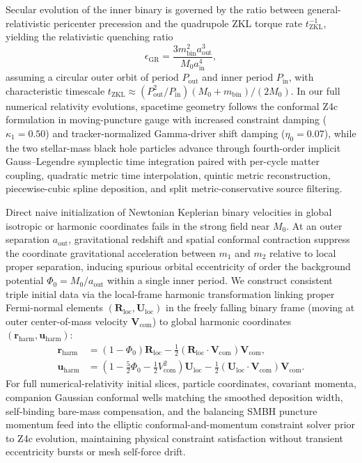 \documentclass[aps,prl,twocolumn,10pt,superscriptaddress,nofootinbib,longbibliography,floatfix]{revtex4-2}
\newcommand{\Mzero}{M_0}
\newcommand{\mbin}{m_{\mathrm{bin}}}
\newcommand{\ain}{a_{\mathrm{in}}}
\newcommand{\aout}{a_{\mathrm{out}}}
\newcommand{\epsGR}{\epsilon_{\mathrm{GR}}}
\newcommand{\tZKL}{t_{\mathrm{ZKL}}}
\begin{document}
Secular evolution of the inner binary is governed by the ratio between general-relativistic pericenter precession and the quadrupole ZKL torque rate $\tZKL^{-1}$, yielding the relativistic quenching ratio \cite{Blaes:2002,Liu:2015}
\begin{equation}
  \epsGR = \frac{3 \mbin^2 \aout^3}{\Mzero \ain^4},
\end{equation}
assuming a circular outer orbit of period $P_{\mathrm{out}}$ and inner period $P_{\mathrm{in}}$, with characteristic timescale $\tZKL \approx (P_{\mathrm{out}}^2 / P_{\mathrm{in}})(\Mzero + \mbin)/(2\Mzero)$. In our full numerical relativity evolutions, spacetime geometry follows the conformal Z4c formulation \cite{Hilditch:2012fp,Zhu:2024utz} in moving-puncture gauge with increased constraint damping ($\kappa_1 = 0.50$) and tracker-normalized Gamma-driver shift damping ($\eta_0 = 0.07$), while the two stellar-mass black hole particles advance through fourth-order implicit Gauss--Legendre symplectic time integration \cite{SanzSerna:1988,Wu:2026nrpic} paired with per-cycle matter coupling, quadratic metric time interpolation, quintic metric reconstruction, piecewise-cubic spline deposition, and split metric-conservative source filtering.

Direct naive initialization of Newtonian Keplerian binary velocities in global isotropic or harmonic coordinates fails in the strong field near $\Mzero$. At an outer separation $\aout$, gravitational redshift and spatial conformal contraction suppress the coordinate gravitational acceleration between $m_1$ and $m_2$ relative to local proper separation, inducing spurious orbital eccentricity of order the background potential $\Phi_0 = \Mzero/\aout$ within a single inner period. We construct consistent triple initial data via the local-frame harmonic transformation linking proper Fermi-normal elements $(\bm{R}_{\mathrm{loc}}, \bm{U}_{\mathrm{loc}})$ in the freely falling binary frame (moving at outer center-of-mass velocity $\bm{V}_{\mathrm{com}}$) to global harmonic coordinates $(\bm{r}_{\mathrm{harm}}, \bm{u}_{\mathrm{harm}})$:
\begin{align}
  \bm{r}_{\mathrm{harm}} &= (1 - \Phi_0)\bm{R}_{\mathrm{loc}} - \tfrac{1}{2}(\bm{R}_{\mathrm{loc}}\cdot\bm{V}_{\mathrm{com}})\bm{V}_{\mathrm{com}}, \\
  \bm{u}_{\mathrm{harm}} &= \left(1 - \tfrac{5}{2}\Phi_0 - \tfrac{1}{2}V_{\mathrm{com}}^2\right)\bm{U}_{\mathrm{loc}} - \tfrac{1}{2}(\bm{U}_{\mathrm{loc}}\cdot\bm{V}_{\mathrm{com}})\bm{V}_{\mathrm{com}}.
\end{align}
For full numerical-relativity initial slices, particle coordinates, covariant momenta, companion Gaussian conformal wells matching the smoothed deposition width, self-binding bare-mass compensation, and the balancing SMBH puncture momentum feed into the elliptic conformal-and-momentum constraint solver prior to Z4c evolution, maintaining physical constraint satisfaction without transient eccentricity bursts or mesh self-force drift.
\end{document}
